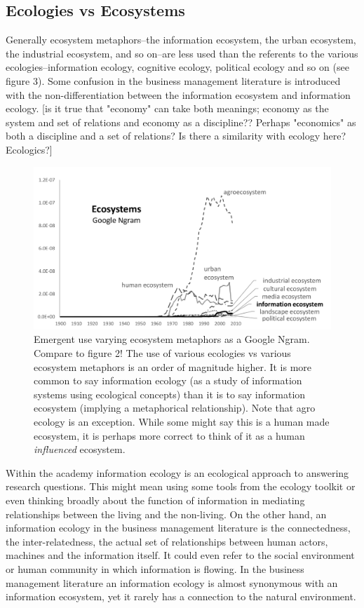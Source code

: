 \subsection{Ecologies vs Ecosystems}

Generally ecosystem metaphors--the information ecosystem, the urban ecosystem, the industrial ecosystem, and so on--are less used than the referents to the various ecologies--information ecology, cognitive ecology, political ecology and so on (see figure 3). Some confusion in the business management literature is introduced with the non-differentiation between the information ecosystem and information ecology. [is it true that "economy" can take both meanings; economy as the system and set of relations and economy as a discipline?? Perhaps "economics" as both a discipline and a set of relations? Is there a similarity with ecology here? Ecologics?]

\begin{figure}[!ht]
  \centering
    \includegraphics[width=5.5in]{figures/ecosystemsAll}
  \caption{Emergent use varying ecosystem metaphors as a Google Ngram. Compare to figure 2! The use of various ecologies vs various ecosystem metaphors is an order of magnitude higher. It is more common to say information ecology (as a study of information systems using ecological concepts) than it is to say information ecosystem (implying a metaphorical relationship). Note that agro ecology is an exception. While some might say this is a human made ecosystem, it is perhaps more correct to think of it as a human \textit{influenced} ecosystem.}
\end{figure}

Within the academy information ecology is an ecological approach to answering research questions. This might mean using some tools from the ecology toolkit or even thinking broadly about the function of information in mediating relationships between the living and the non-living. On the other hand, an information ecology in the business management literature is the connectedness, the inter-relatedness, the actual set of relationships between human actors, machines and the information itself. It could even refer to the social environment or human community in which information is flowing. In the business management literature an information ecology is almost synonymous with an information ecosystem, yet it rarely has a connection to the natural environment.

